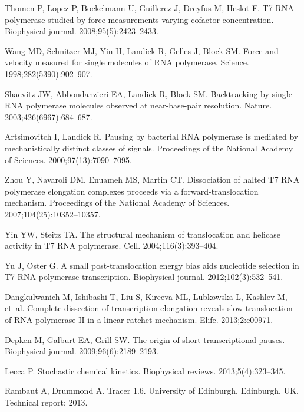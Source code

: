 \documentclass[10pt,letterpaper]{article}
\begin{document}
{{\begin{thebibliography}{10}
Thomen P, Lopez P, Bockelmann U, Guillerez J, Dreyfus M, Heslot F.
\newblock T7 RNA polymerase studied by force measurements varying cofactor
  concentration.
\newblock Biophysical journal. 2008;95(5):2423--2433.

Wang MD, Schnitzer MJ, Yin H, Landick R, Gelles J, Block SM.
\newblock Force and velocity measured for single molecules of RNA polymerase.
\newblock Science. 1998;282(5390):902--907.

Shaevitz JW, Abbondanzieri EA, Landick R, Block SM.
\newblock Backtracking by single RNA polymerase molecules observed at
  near-base-pair resolution.
\newblock Nature. 2003;426(6967):684--687.

Artsimovitch I, Landick R.
\newblock Pausing by bacterial RNA polymerase is mediated by mechanistically
  distinct classes of signals.
\newblock Proceedings of the National Academy of Sciences.
  2000;97(13):7090--7095.

Zhou Y, Navaroli DM, Enuameh MS, Martin CT.
\newblock Dissociation of halted T7 RNA polymerase elongation complexes
  proceeds via a forward-translocation mechanism.
\newblock Proceedings of the National Academy of Sciences.
  2007;104(25):10352--10357.

Yin YW, Steitz TA.
\newblock The structural mechanism of translocation and helicase activity in T7
  RNA polymerase.
\newblock Cell. 2004;116(3):393--404.

Yu J, Oster G.
\newblock A small post-translocation energy bias aids nucleotide selection in
  T7 RNA polymerase transcription.
\newblock Biophysical journal. 2012;102(3):532--541.

Dangkulwanich M, Ishibashi T, Liu S, Kireeva ML, Lubkowska L, Kashlev M, et~al.
\newblock Complete dissection of transcription elongation reveals slow
  translocation of RNA polymerase II in a linear ratchet mechanism.
\newblock Elife. 2013;2:e00971.

Depken M, Galburt EA, Grill SW.
\newblock The origin of short transcriptional pauses.
\newblock Biophysical journal. 2009;96(6):2189--2193.

Lecca P.
\newblock Stochastic chemical kinetics.
\newblock Biophysical reviews. 2013;5(4):323--345.

Rambaut A, Drummond A.
\newblock Tracer 1.6. University of Edinburgh, Edinburgh.
\newblock UK. Technical report; 2013.


\end{thebibliography}}}
\end{document}
